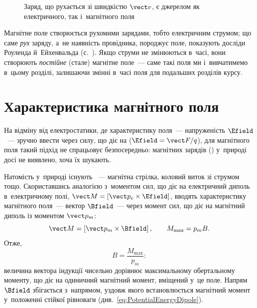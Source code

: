 \begin{figure}\centering
	\caption{Заряд, що рухається зі швидкістю $\vect v$, є джерелом як електричного, так
		і~магнітного поля\label{pic:ChargeFields}}
\end{figure}

Магнітне поле створюється рухомими зарядами, тобто електричним струмом; що саме
\emph{рух} заряду, а~не наявність провідника, породжує поле, показують досліди Роуленда
й~Ейхенвальда (с.~\pageref{hist:RowlandEichenwald}). Якщо струми не змінюються в~часі,
вони створюють \emph{постійне} (стале) магнітне поле~--- саме такі поля ми і~вивчатимемо
в~цьому розділі, залишаючи змінні в~часі поля для подальших розділів курсу.


\section{Характеристика магнітного поля}\hypertarget{magnetic-field-characteristics}{}


На відміну від електростатики, де характеристику поля~--- напруженість $\Efield$~---
зручно ввести через силу, що діє на  ($\Efield = \vect F/q$), для
магнітного поля такий підхід не спрацьовує безпосередньо: магнітних зарядів
() у~природі досі не виявлено, хоча їх шукають.

Натомість у~природі існують ~--- магнітна стрілка, коловий виток зі
струмом тощо. Скориставшись аналогією з~моментом сил, що діє на електричний диполь
в~електричному полі, $\vect M = \left[\vect p_e\times\Efield\right]$, вводять
характеристику магнітного поля~--- вектор $\Bfield$~--- через момент сил, що діє на
магнітний диполь із моментом $\vect p_m$:
\begin{equation}\label{eq:TorqueDipoleAnalogy}
	\vect M = \left[\vect p_m\times\Bfield\right], \qquad M_{\max} = p_m B.
\end{equation}
Отже,
\begin{equation*}
	B = \frac{M_{\max}}{p_m}:
\end{equation*}
величина вектора індукції чисельно дорівнює максимальному обертальному моменту, що діє на
одиничний магнітний момент, вміщений у~це поле. Напрям $\Bfield$ збігається з~напрямом,
уздовж якого встановлюється магнітний момент у~положенні стійкої рівноваги
(див.~\eqref{eq:PotentialEnergyDipole}).

